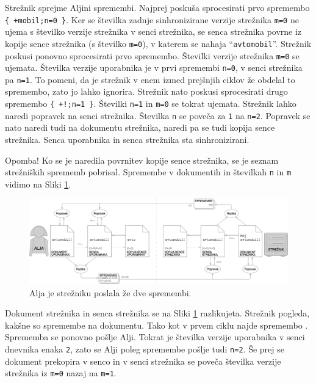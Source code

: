 \documentclass[a4paper, 12pt, twoside]{book}
\begin{document}
Strežnik sprejme Aljini spremembi. Najprej poskuša sprocesirati prvo spremembo {\tt \{ +mobil;n=0 \}}. Ker se številka zadnje sinhronizirane verzije strežnika {\tt m=0} ne ujema s številko verzije strežnika v senci strežnika, se senca strežnika povrne iz kopije sence strežnika (s številko {\tt m=0}), v katerem se nahaja “{\tt avtomobil}”. Strežnik poskusi ponovno sprocesirati prvo spremembo. Številki verzije strežnika {\tt m=0} se ujemata. Številka verzije uporabnika je v prvi spremembi {\tt n=0}, v senci strežnika pa {\tt n=1}. To pomeni, da je strežnik v enem izmed prejšnjih ciklov že obdelal to spremembo, zato jo lahko ignorira. Strežnik nato poskusi sprocesirati drugo spremembo {\tt \{ +!;n=1 \}}. Številki {\tt n=1} in {\tt m=0} se tokrat ujemata. Strežnik lahko naredi popravek na senci strežnika. Številka {\tt n} se poveča za {\tt 1} na {\tt n=2}. Popravek se nato naredi tudi na dokumentu strežnika, naredi pa se tudi kopija sence strežnika. Senca uporabnika in senca strežnika sta sinhronizirani.

\pagebreak

Opomba! Ko se je naredila povrnitev kopije sence strežnika, se je seznam strežniških sprememb pobrisal. Spremembe v dokumentih in številkah {\tt n} in {\tt m} vidimo na Sliki \ref{ds8}.

\begin{figure}[placement h]
\begin{center}
\includegraphics[width=16cm]{ds8.png}
\end{center}
\caption{Alja je strežniku poslala že dve spremembi.}
\label{ds8}
\end{figure}

Dokument strežnika in senca strežnika se na Sliki \ref{ds8} razlikujeta. Strežnik pogleda, kakšne so spremembe na dokumentu. Tako kot v prvem ciklu najde spremembo . Sprememba se ponovno pošlje Alji. Tokrat je številka verzije uporabnika v senci dnevnika enaka {\tt 2}, zato se Alji poleg spremembe pošlje tudi {\tt n=2}. Še prej se dokument prekopira v senco in v senci strežnika se poveča številka verzije strežnika iz {\tt m=0} nazaj na {\tt m=1}.
\end{document}

